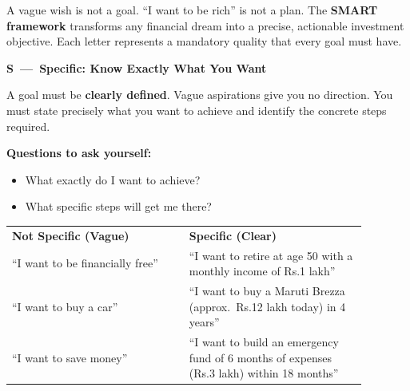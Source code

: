\documentclass[12pt,a4paper]{article}
\makeatletter
\newcommand{\rupee}{\ifmmode\text{Rs.}\else Rs.\@\fi}
\newcommand{\smartheading}[4]{%
  \begingroup
  \setlength{\fboxsep}{4pt}%
  \noindent\colorbox{#1}{%
    \parbox{\dimexpr\linewidth-2\fboxsep\relax}{%
      \Large\bfseries\color{#4}#2\ \normalsize\bfseries---\ #3\strut%
    }%
  }%
  \par\endgroup\medskip
}
\makeatother
\begin{document}
A vague wish is not a goal. ``I want to be rich'' is not a plan. The \textbf{SMART framework} transforms any financial dream into a precise, actionable investment objective. Each letter represents a mandatory quality that every goal must have.

\vspace{3mm}

\begin{tcolorbox}[base, colback=SMARTblue!8, colframe=SMARTblue]
\smartheading{SMARTblue}{S}{Specific: Know Exactly What You Want}{white}

A goal must be \textbf{clearly defined}. Vague aspirations give you no direction. You must state precisely what you want to achieve and identify the concrete steps required.

\medskip
\textbf{Questions to ask yourself:}
\begin{itemize}
  \item What exactly do I want to achieve?
  \item What specific steps will get me there?
\end{itemize}

\medskip
\begin{tabular}{p{0.44\linewidth} p{0.44\linewidth}}
\textbf{\color{AccentRed}Not Specific (Vague)} & \textbf{\color{AccentGreen}Specific (Clear)}\\
``I want to be financially free'' & ``I want to retire at age 50 with a monthly income of \rupee{}1 lakh''\\[4pt]
``I want to buy a car'' & ``I want to buy a Maruti Brezza (approx.\ \rupee{}12 lakh today) in 4 years''\\[4pt]
``I want to save money'' & ``I want to build an emergency fund of 6 months of expenses (\rupee{}3 lakh) within 18 months''\\
\end{tabular}
\end{tcolorbox}

\vspace{3mm}
\end{document}
